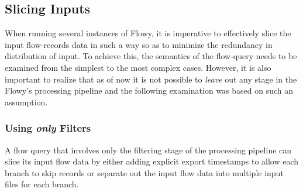 \subsection{Slicing Inputs}\label{subsec:slice-input}
When running several instances of Flowy, it is imperative to effectively slice the input flow-records data in such a way so as to minimize the redundancy in distribution of input. To achieve this, the semantics of the flow-query needs to be examined from the simplest to the most complex cases. However, it is also important to realize that as of now it is not possible to \emph{leave} out any stage in the Flowy's processing pipeline and the following examination was based on such an assumption.

\subsubsection{Using \emph{only} Filters}\label{subsec:filters-only}
A flow query that involves only the filtering stage of the processing pipeline can slice its input flow data by either adding explicit export timestamps to allow each branch to skip records or separate out the input flow data into multiple input files for each branch.

